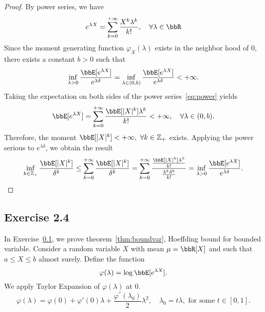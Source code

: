 \documentclass[11pt]{article}
\theoremstyle{plain}
\theoremstyle{definition}
\begin{document}
\begin{proof}
	By power series, we have
	\begin{equation}\label{eq:power}
		 e^{\lambda X} = \sum_{k = 0}^{+\infty } \frac{X^k \lambda^k }{k!}, \quad \forall \lambda \in \bbR
	\end{equation}
	Since the moment generating function $\varphi_X(\lambda)$ exists in the neighbor hood of 0, there exists a constant $b > 0$ such that 
	\[  \inf_{\lambda >0} \frac{\bbE[e^{\lambda X}]}{e^{\lambda \delta}} = \inf_{\lambda \in (0,b)} \frac{\bbE[e^{\lambda X}]}{e^{\lambda \delta}} < +\infty. \]
	Taking the expectation on both sides of the power series~\eqref{eq:power} yields
	\[   \bbE [e^{\lambda X} ]= \sum_{k = 0}^{+\infty } \frac{ \bbE[|X|^k]  \lambda^k }{k!} < +\infty,\quad \forall \lambda \in (0,b). \]
	Therefore, the moment $\bbE[|X|^k] < +\infty,\  \forall k \in \mathbb{Z}_+$ exists. Applying the power serious to $e^{\lambda \delta}$, we obtain the result
	\[ \inf_{k \in \mathbb{Z_+} } \frac{\bbE[|X|^k]}{\delta^k} \leq \sum_{k = 0}^{+\infty } \frac{ \bbE[|X|^k] }{\delta^k} = \sum_{k = 0}^{+\infty } \frac{\frac{ \bbE[|X|^k]  \lambda^k }{k!} }{\frac{\lambda^k \delta^k }{k!}  } = \inf_{\lambda > 0} \frac{\bbE[e^{\lambda X}]}{e^{\lambda \delta}}.  \]
\end{proof}

\subsection{Exercise 2.4}\label{pro:boundvar}
In Exercise~\ref{pro:boundvar}, we prove theorem~\ref{thm:boundvar}, Hoeffding bound for bounded variable. Consider a random variable $X$ with mean $\mu = \bbR[X]$ and such that $a \leq X \leq b$ almost surely. Define the function 
\[ \varphi(\lambda) = \log \bbE[e^{\lambda X }]. \]
We apply Taylor Expansion of $\varphi(\lambda)$ at 0.
\begin{equation}\label{eq:taylor}
	\varphi(\lambda) =  \varphi(0) + \varphi'(0) \lambda  + \frac{\varphi^{''}(\lambda_0) }{2} \lambda^2, \quad \lambda_0 = t \lambda, \text{ for some } t \in [0,1]. 
\end{equation}
\end{document}
